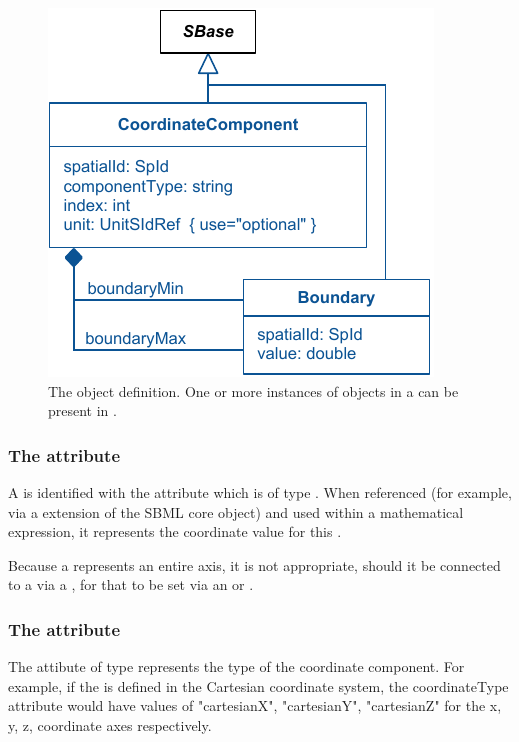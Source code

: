 \begin{figure}[ht]
  \includegraphics{figs/CoordinateComponent-uml}
  \caption{The \CoordinateComponent object definition. One or more instances of \CoordinateComponent objects in a \ListOfCoordinateComponents can be present in \Geometry.}
  \label{CoordinateComponent-uml}
\end{figure}


\subsubsection{The  attribute}
A \CoordinateComponent is identified with the  attribute which is of type .  When referenced (for example, via a \SpatialSymbolReference extension of the SBML core \Parameter object) and used within a mathematical expression, it represents the coordinate value for this \CoordinateComponent.

Because a \CoordinateComponent represents an entire axis, it is not appropriate, should it be connected to a \Parameter via a \SpatialSymbolReference, for that \Parameter to be set via an \InitialAssignment or \Rule.  

\subsubsection{The  attribute}
The  attibute of type  represents the type of the coordinate component. For example, if the \Geometry is defined in the Cartesian coordinate system, the coordinateType attribute would have values of "cartesianX", "cartesianY", "cartesianZ" for the x, y, z, coordinate axes respectively. 

